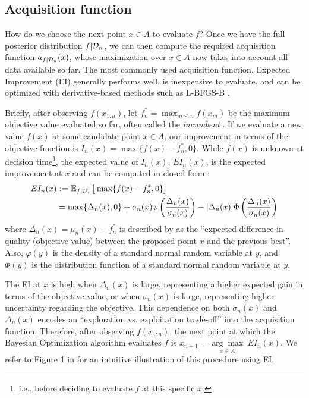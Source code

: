 \subsection{Acquisition function}

How do we choose the next point $x\in A$ to evaluate $f$? Once we have the full posterior distribution $f\vert \mathcal{D}_n$, we can then compute the required acquisition function $a_{f\vert\mathcal{D}_n}(x)$, whose maximization over $x\in A$ now takes into account all data available so far. The most commonly used acquisition function,  Expected Improvement  (EI) generally performs well, is inexpensive to evaluate, and can be optimized with derivative-based methods such as L-BFGS-B \cite{Frazier2018, Jones1998, Liu1989}.

Briefly, after observing $f(x_{1:n})$, let $f_n^*=\max_{m\leq n}f(x_m)$ be the maximum objective value evaluated so far, often called the \textit{incumbent} \cite{Garnett2023}. If we evaluate a new value $f(x)$ at some candidate point $x\in A$, our improvement in terms of the objective function is $I_n(x)=\max\{f(x)-f_n^*, 0\}$. While $f(x)$ is unknown at decision time\footnote{i.e., before deciding to evaluate $f$ at this specific $x$.}, the expected value of $I_n(x)$, $EI_n(x)$, is the expected improvement at $x$ and can be computed in closed form \cite{Frazier2018, Jones1998}:
\begin{align}
    EI_n(x) &{\ :=\ } \mathbb{E}_{f\vert\mathcal{D}_n}\big[\max\{f(x)-f_n^*, 0\}\big]\\
    &=
    \max\{\Delta_n(x), 0\} + \sigma_n(x)\varphi\left(\frac{\Delta_n(x)}{\sigma_n(x)}\right)
    -
    |\Delta_n(x)|\Phi\left(\frac{\Delta_n(x)}{\sigma_n(x)}\right)
    \label{eq:ei}
\end{align}
where $\Delta_n(x)=\mu_n(x)-f_n^*$ is described by  as the ``expected difference in quality (objective value) between the proposed point $x$ and the previous best''. Also, $\varphi(y)$ is the density of a standard normal random variable at $y$, and $\Phi(y)$ is the distribution function of a standard normal random variable at $y$.

The EI at $x$ is high when $\Delta_n(x)$ is large, representing a higher expected gain in terms of the objective value, or when $\sigma_n(x)$ is large, representing higher uncertainty regarding the objective. This dependence on both $\sigma_n(x)$ and $\Delta_n(x)$ encodes an ``exploration vs. exploitation trade-off'' into the acquisition function. Therefore, after observing $f(x_{1:n})$, the next point at which the Bayesian Optimization algorithm evaluates $f$ is $x_{n+1}= \underset{x\in A}{\arg\max}\ EI_n(x)$. We refer to Figure 1 in  for an intuitive illustration of this procedure using EI.


